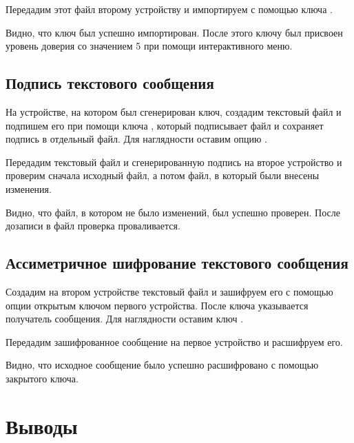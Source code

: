 

Передадим этот файл второму устройству и импортируем с помощью ключа .



Видно, что ключ был успешно импортирован. После этого ключу был присвоен уровень доверия со значением 5 при помощи интерактивного меню.



\subsection{Подпись текстового сообщения}

На устройстве, на котором был сгенерирован ключ, создадим текстовый файл  и подпишем его при помощи ключа , который подписывает файл и сохраняет подпись в отдельный файл. Для наглядности оставим опцию . 



Передадим текстовый файл и сгенерированную подпись на второе устройство и проверим сначала исходный файл, а потом файл, в который были внесены изменения.



Видно, что файл, в котором не было изменений, был успешно проверен. После дозаписи в файл проверка проваливается. 

\subsection{Ассиметричное шифрование текстового сообщения}

Создадим на втором устройстве текстовый файл  и зашифруем его с помощью опции  открытым ключом первого устройства. После ключа  указывается получатель сообщения. Для наглядности оставим ключ . 



Передадим зашифрованное сообщение на первое устройство и расшифруем его.



Видно, что исходное сообщение было успешно расшифровано с помощью закрытого ключа.

\section{Выводы}

